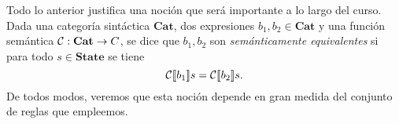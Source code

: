 Todo lo anterior justifica una noción que será importante a lo largo del curso. Dada una categoría sintáctica $\textbf{Cat}$, dos expresiones $b_1, b_2 \in \textbf{Cat}$ y una función semántica $\mathcal{C}: \textbf{Cat}\rightarrow C$, se dice que $b_1, b_2$ son \textit{semánticamente equivalentes} si para todo $s\in \textbf{State}$ se tiene
\[
    \mathcal{C}[\![b_1]\!]s = \mathcal{C}[\![b_2]\!]s.
\]
De todos modos, veremos que esta noción depende en gran medida del conjunto de reglas que empleemos.